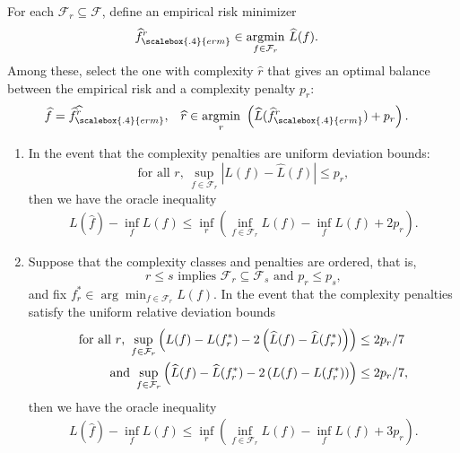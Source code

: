 \begin{theorem}\label{thm:complexity-reg}
For each ${\mathcal F}_r\subseteq {\mathcal F}$, define an empirical risk minimizer
  \begin{align*}
    \widehat{f}_{\scalebox{.4}{erm}}^r & \in\underset{f\in{\mathcal F}_r}{\mathrm{argmin}} \ \widehat L(f).
  \end{align*}
Among these, select the one with complexity $\widehat r$ that gives an optimal balance between the empirical risk and a complexity penalty $p_r$:
  \begin{align}\label{eqn:PERM}
    \widehat f&=\widehat{f}_{\scalebox{.4}{erm}}^{\widehat r}, &
    \widehat r & \in \underset{r}{\mathrm{argmin}} \  \left(\widehat L(\widehat{f}_{\scalebox{.4}{erm}}^r) + p_r\right).
  \end{align}
  \begin{enumerate}
    \item In the event that the complexity penalties are uniform deviation bounds:
    \begin{equation}\label{eqn:unifdev}
      \text{for all $r$, }
      \sup_{f\in {\mathcal F}_r}
        \left|L(f)-\widehat L(f)\right|
        \le p_r,
    \end{equation}
    then we have the oracle inequality
      \begin{align}\label{eqn:oracleslow}
         L(\widehat f) - \inf_{f} L(f) \le \inf_r \left( \inf_{f\in {\mathcal F}_r}  L(f) - \inf_{f} L(f) + 2p_r\right).
      \end{align}
    \item Suppose that the complexity classes and penalties are ordered, that is,
      \[
        r\le s\text{ implies } {\mathcal F}_r\subseteq {\mathcal F}_s\text{ and } p_r\le p_s,
      \]
    and fix $f_r^* \in \arg\min_{f\in{\mathcal F}_r} L(f)$. In the event that the complexity penalties satisfy the uniform relative deviation bounds
    \begin{align}\label{eqn:unifreldev}
      \text{for all $r$, }
      \sup_{f\in{\mathcal F}_r}\left(
         L(f)-
         L(f^*_r) -
        2\left(\widehat L(f) -
        \widehat L(f^*_r)\right)\right)
        & \le 2p_r/7 \\
      \text{and }
      \sup_{f\in{\mathcal F}_r}\left(
        \widehat L(f)-
        \widehat L(f^*_r) -
        2\left( L(f) -
         L(f^*_r)\right)\right)
        & \le 2p_r/7,\notag
    \end{align}
    then we have the oracle inequality
      \begin{align}\label{eqn:oraclefast}
         L(\widehat f) - \inf_{f} L(f) \le \inf_r \left( \inf_{f\in{\mathcal F}_r}  L(f) - \inf_{f} L(f) + 3p_r\right).
      \end{align}
  \end{enumerate}
\end{theorem}

